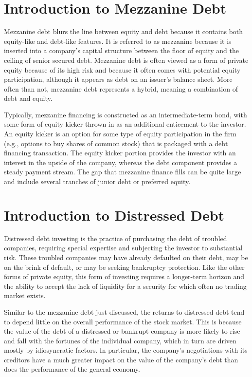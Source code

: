 \documentclass[11pt]{article}
\begin{document}
\section*{Introduction to Mezzanine Debt}
Mezzanine debt blurs the line between equity and debt because it contains both equity-like and debt-like features. It is referred to as mezzanine because it is inserted into a company's capital structure between the floor of equity and the ceiling of senior secured debt. Mezzanine debt is often viewed as a form of private equity because of its high risk and because it often comes with potential equity participation, although it appears as debt on an issuer's balance sheet. More often than not, mezzanine debt represents a hybrid, meaning a combination of debt and equity.

Typically, mezzanine financing is constructed as an intermediate-term bond, with some form of equity kicker thrown in as an additional enticement to the investor. An equity kicker is an option for some type of equity participation in the firm (e.g., options to buy shares of common stock) that is packaged with a debt financing transaction. The equity kicker portion provides the investor with an interest in the upside of the company, whereas the debt component provides a steady payment stream. The gap that mezzanine finance fills can be quite large and include several tranches of junior debt or preferred equity.

\section*{Introduction to Distressed Debt}
Distressed debt investing is the practice of purchasing the debt of troubled companies, requiring special expertise and subjecting the investor to substantial risk. These troubled companies may have already defaulted on their debt, may be on the brink of default, or may be seeking bankruptcy protection. Like the other forms of private equity, this form of investing requires a longer-term horizon and the ability to accept the lack of liquidity for a security for which often no trading market exists.

Similar to the mezzanine debt just discussed, the returns to distressed debt tend to depend little on the overall performance of the stock market. This is because the value of the debt of a distressed or bankrupt company is more likely to rise and fall with the fortunes of the individual company, which in turn are driven mostly by idiosyncratic factors. In particular, the company's negotiations with its creditors have a much greater impact on the value of the company's debt than does the performance of the general economy.
\end{document}
